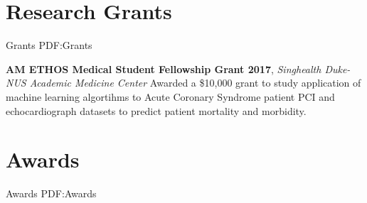 \documentclass[letterpaper,10pt,oneside]{article}
\begin{document}
\begin{body}
\begin{enumerate}




\end{enumerate}


\section
{Research Grants}
{Grants}
{PDF:Grants}

\textbf{AM ETHOS Medical Student Fellowship Grant 2017},
\hfill{}
\GapNoBreak
\textit{Singhealth Duke-NUS Academic Medicine Center}
\GapNoBreak
\BulletItem
Awarded a \$10,000 grant to study application of machine learning algortihms to Acute Coronary Syndrome patient PCI and echocardiograph datasets to predict patient mortality and morbidity.
\GapNoBreak



\section
{Awards}
{Awards}
{PDF:Awards}


\end{body}
\end{document}
